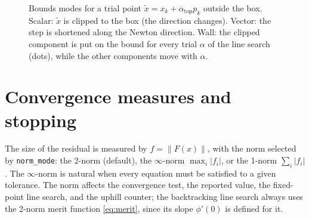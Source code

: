 \documentclass[11pt]{article}
\newcommand{\norm}[1]{\left\lVert #1 \right\rVert}
\newcommand{\code}[1]{\texttt{#1}}
\begin{document}
\begin{figure}[htbp]
\centering
{}
\caption{Bounds modes for a trial point $\tilde x = x_k + \alpha_{\text{top}} p_k$ outside the box. Scalar: $\tilde x$ is clipped
to the box (the direction changes). Vector: the step is shortened along the Newton direction. Wall: the
clipped component is put on the bound for every trial $\alpha$ of the line search (dots), while the other
components move with $\alpha$.}
\label{fig:bounds}
\end{figure}

\section{Convergence measures and stopping}
\label{sec:stopping}

The size of the residual is measured by $f = \norm{F(x)}$, with the norm selected by
\code{norm\_mode}: the 2-norm (default), the $\infty$-norm $\max_i |f_i|$, or the 1-norm
$\sum_i |f_i|$. The $\infty$-norm is natural when every equation must be satisfied to a given
tolerance. The norm affects the convergence test, the reported value, the fixed-point line search,
and the uphill counter; the backtracking line search always uses the 2-norm merit function
\cref{eq:merit}, since its slope $\phi'(0)$ is defined for it.
\end{document}
